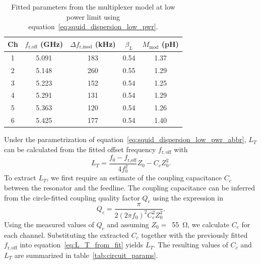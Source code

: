 \documentclass[
 prd,
 reprint,
 superscriptaddress,
 amsmath,amssymb,
 aps,
 floatfix,
]{revtex4-2}
\begin{document}
\begin{table}[htb]
    \centering
    \begin{tabular}{c c c c c}
    \hline
         \small{Ch} & \small{$f_{\text{r,off}}$ (GHz)} & \small{$\Delta f_{\text{r,mod}}$ (kHz)} & \small{$\beta_L$} & \small{$M_{\text{mod}}$ (pH)}\\
    \hline
    1 & 5.091 & 183 & 0.54 & 1.37 \\
    2 & 5.148 & 260 & 0.55 & 1.29 \\
    3 & 5.223 & 152 & 0.54 & 1.25 \\
    4 & 5.291 & 131 & 0.54 & 1.29 \\
    5 & 5.363 & 120 & 0.54 & 1.26 \\
    6 & 5.425 & 177 & 0.54 & 1.40 \\
    \hline
    \end{tabular}
    \caption{Fitted parameters from the multiplexer model at low power limit using equation~\eqref{eq:squid_dispersion_low_pwr}.}
    \label{tab:mates_fit_params}
\end{table}

Under the parametrization of equation~\eqref{eq:squid_dispersion_low_pwr_abbr}, $L_T$ can be calculated from the fitted offset frequency $f_{\mathrm{r,off}}$ with
\begin{equation} \label{eq:L_T_from_fit}
    L_T = \frac{f_0-f_{\text{r,off}}}{4f_0^2}Z_0 - C_c Z_0^2.
\end{equation}
To extract $L_T$, we first require an estimate of the coupling capacitance $C_c$ between the resonator and the feedline. The coupling capacitance can be inferred from the circle-fitted coupling quality factor $Q_c$ using the expression in~\cite{mates_microwave_2011}
\begin{equation}
    Q_c = \frac{\pi}{2 (2 \pi f_0)^2 C_c^2 Z_0^2}.
\end{equation}
Using the measured values of $Q_c$ and assuming \mbox{$Z_0 =$ \qty{55}{\ohm}}, we calculate $C_c$ for each channel. Substituting the extracted $C_c$ together with the previously fitted $f_{\mathrm{r,off}}$ into equation~\eqref{eq:L_T_from_fit} yields $L_T$. The resulting values of $C_c$ and $L_T$ are summarized in table~\ref{tab:circuit_params}.
\end{document}
